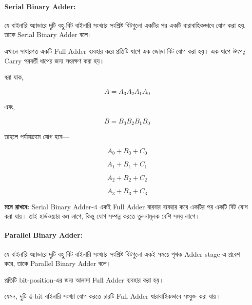 
\paragraph{\textenglish{Serial Binary Adder}:}

যে বাইনারি অ্যাডারে দুটি বহু-বিট বাইনারি সংখ্যার সংশ্লিষ্ট বিটগুলো
একটির পর একটি ধারাবাহিকভাবে যোগ করা হয়,
তাকে \textenglish{Serial Binary Adder} বলে।

এখানে সাধারণত একটি \textenglish{Full Adder} ব্যবহার করে
প্রতিটি ধাপে এক জোড়া বিট যোগ করা হয়।
এক ধাপে উৎপন্ন \textenglish{Carry} পরবর্তী ধাপের জন্য সংরক্ষণ করা হয়।

ধরা যাক,

\[
A=A_3A_2A_1A_0
\]

এবং,

\[
B=B_3B_2B_1B_0
\]

তাহলে পর্যায়ক্রমে যোগ হবে—

\[
A_0+B_0+C_0
\]

\[
A_1+B_1+C_1
\]

\[
A_2+B_2+C_2
\]

\[
A_3+B_3+C_3
\]

\par\begingroup

\textbf{মনে রাখবে:}
\textenglish{Serial Binary Adder}-এ একই \textenglish{Full Adder}
বারবার ব্যবহার করে একটির পর একটি বিট যোগ করা যায়।
তাই হার্ডওয়্যার কম লাগে, কিন্তু যোগ সম্পন্ন করতে তুলনামূলক বেশি সময় লাগে।
\par\endgroup




\paragraph{\textenglish{Parallel Binary Adder}:}

যে বাইনারি অ্যাডারে দুটি বহু-বিট বাইনারি সংখ্যার সংশ্লিষ্ট বিটগুলো
একই সময়ে পৃথক \textenglish{Adder stage}-এ প্রবেশ করে,
তাকে \textenglish{Parallel Binary Adder} বলে।

প্রতিটি \textenglish{bit-position}-এর জন্য আলাদা
\textenglish{Full Adder} ব্যবহার করা হয়।

যেমন, দুটি \(4\)-\textenglish{bit} বাইনারি সংখ্যা যোগ করতে
চারটি \textenglish{Full Adder} ধারাবাহিকভাবে সংযুক্ত করা যায়।


